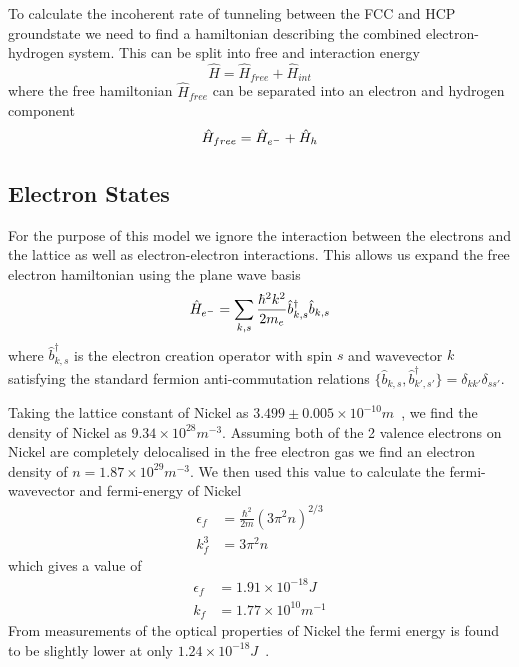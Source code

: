 To calculate the incoherent
rate of tunneling between
the FCC and HCP groundstate
we need to find a
hamiltonian describing the combined
electron-hydrogen system.
This can be split into free and interaction energy
\begin{equation}
    \hat{H} = \hat{H}_{free} + \hat{H}_{int}
\end{equation}
where the free hamiltonian \(\hat{H}_{free}\)
can be separated
into an electron and hydrogen component
\begin{equation}
    \hat{H}_{free} =
    \hat{H}_{e^-} + \hat{H}_{h}\\
\end{equation}

\subsection{Electron States}\label{sec:electron states}
For the purpose of this model we ignore the
interaction between the electrons
and the lattice as well as electron-electron
interactions. This allows
us expand the free electron
hamiltonian using the plane wave
basis
\begin{equation}
    \hat{H}_{e^-} = \sum_{k, s}
    \frac{\hbar^2 k^2}{2m_e} \hat{b}^\dagger_{k, s} \hat{b}_{k, s}\\
\end{equation}
where \(\hat{b}^\dagger_{k, s}\)
is the electron creation operator
with spin \(s\) and wavevector
\(k\) satisfying the standard
fermion anti-commutation relations
\( \{ \hat{b}_{k, s}, \hat{b}^\dagger_{k', s'} \}
= \delta_{k k'} \delta_{s s'}\).

Taking the lattice constant of Nickel as
\(3.499\pm{}0.005\times{}10^{-10}m\)~\cite{PhysRev.25.753},
we find the density of Nickel as
\(9.34\times{}10^{28}m^{-3}\).
Assuming both of the 2 valence
electrons on Nickel are completely
delocalised in
the free electron gas we
find an electron density of
\(n = 1.87\times{}10^{29} m^{-3}\).
We then used this value to calculate
the fermi-wavevector and fermi-energy of
Nickel~\cite{KittelCharles1953Itss}
\begin{align}
    \epsilon_f & = \frac{\hbar^2}{2m} {(3\pi^2n)}^{2/3} \\
    k_f^3      & = 3 \pi^2 n
\end{align}
which gives a value of
\begin{align}
    \epsilon_f & = 1.91\times{}10^{-18}J                                  \\
    k_f        & = 1.77\times{}10^{10}m^{-1} \label{eqn:fermi wavevector}
\end{align}
From measurements of the optical
properties of Nickel the
fermi energy is found to
be slightly lower
at only
\(1.24\times{} 10^{-18}J\)~\cite{PhysRev.131.2469}.

